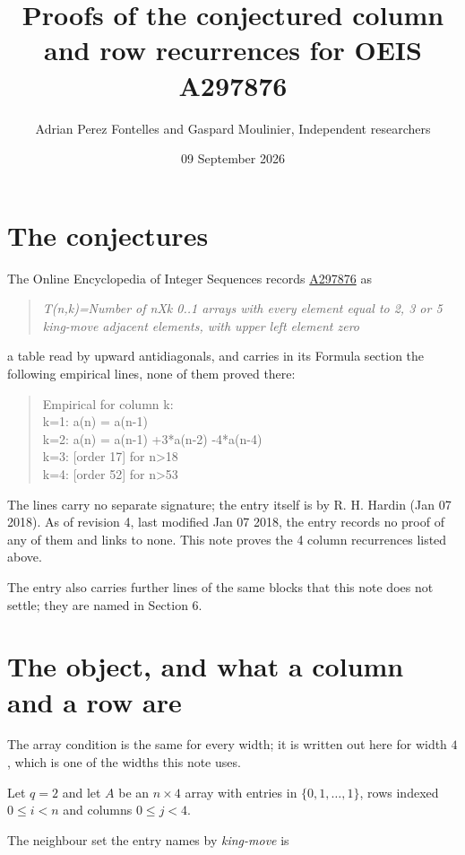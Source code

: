 \documentclass[11pt]{article}
\title{Proofs of the conjectured column and row recurrences for OEIS A297876}
\author{Adrian Perez Fontelles and Gaspard Moulinier, Independent researchers}
\date{09 September 2026}
\theoremstyle{definition}
\begin{document}
\maketitle
\section{The conjectures}

The Online Encyclopedia of Integer Sequences records \href{https://oeis.org/A297876}{A297876} as

\begin{quote}\itshape T(n,k)=Number of nXk 0..1 arrays with every element equal to 2, 3 or 5 king-move adjacent elements, with upper left element zero\end{quote}

a table read by upward antidiagonals, and carries in its Formula section the following empirical lines, none of them proved there:

\begin{quote}\ttfamily Empirical for column k:\\
k=1: a(n) = a(n-1)\\k=2: a(n) = a(n-1) +3*a(n-2) -4*a(n-4)\\k=3: [order 17] for n>18\\k=4: [order 52] for n>53\end{quote}

The lines carry no separate signature; the entry itself is by R. H. Hardin (Jan 07 2018). As of revision 4, last modified Jan 07 2018, the entry records no proof of any of them and links to none. This note proves the 4 column recurrences listed above.

The entry also carries further lines of the same blocks that this note does not settle; they are named in Section 6.

\section{The object, and what a column and a row are}

The array condition is the same for every width; it is written out here for width $4$, which is one of the widths this note uses.

Let $q = 2$ and let $A$ be an $n \times 4$ array with entries in $\{0,1,\dots,1\}$, rows indexed $0 \le i < n$ and columns $0 \le j < 4$.

The neighbour set the entry names by {\itshape king-move} is
\end{document}
